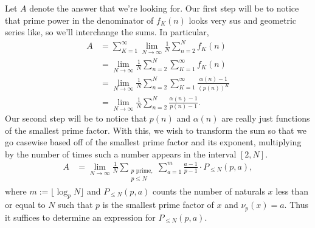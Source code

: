 \documentclass[a4paper, 12pt]{article}
\begin{document}
\begin{solution}
    Let \( A \) denote the answer that we're looking for. Our first step will be to notice that prime power in the denominator of \( f_K(n) \) looks very sus and geometric series like, so we'll interchange the sums. In particular,
    \begin{align*}
        A &= \sum_{K = 1}^{\infty} \lim_{N \to \infty} \frac{1}{N} \sum_{n = 2}^{N} f_K(n) \\
        &= \lim_{N \to \infty} \frac{1}{N} \sum_{n = 2}^{N} \sum_{K = 1}^{\infty}  f_K(n) \\
        &= \lim_{N \to \infty} \frac{1}{N} \sum_{n = 2}^{N} \sum_{K = 1}^{\infty}  \frac{\alpha(n) - 1}{(p(n))^K} \\
        &= \lim_{N \to \infty} \frac{1}{N} \sum_{n = 2}^{N} \frac{\alpha(n) - 1}{p(n) - 1}
    .\end{align*}
    Our second step will be to notice that \( p(n) \) and \( \alpha(n) \) are really just functions of the smallest prime factor. With this, we wish to transform the sum so that we go casewise based off of the smallest prime factor and its exponent, multiplying by the number of times such a number appears in the interval \( [2, N] \).
    \begin{align*}
        A &= \lim_{N \to \infty} \frac{1}{N} \sum\limits_{\substack{p \textrm{ prime,} \\ p \le N}} \sum_{a = 1}^{m} \frac{a - 1}{p - 1} \cdot P_{\le N}(p, a)
    ,\end{align*}
    where \( m := \lfloor \log_{p} N \rfloor \) and \( P_{\le N}(p, a) \) counts the number of naturals \( x \) less than or equal to \( N \) such that \( p \) is the smallest prime factor of \( x \) and \( \nu_{p}(x) = a \). Thus it suffices to determine an expression for \( P_{\le N} (p, a) \).


\end{solution}
\end{document}
